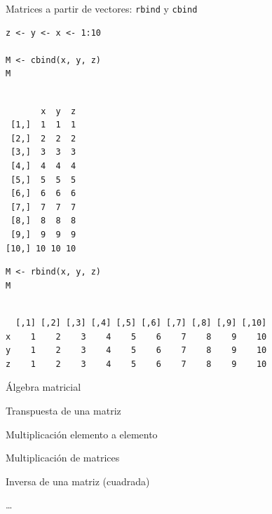\documentclass[aspectratio=169, usenames,svgnames,dvipsnames]{beamer}
\begin{document}
\begin{frame}[label={sec:org4ed9598},fragile]{Matrices a partir de vectores: \texttt{rbind} y \texttt{cbind}}
 \lstset{language=r,label= ,caption= ,captionpos=b,numbers=none}
\begin{lstlisting}
z <- y <- x <- 1:10

M <- cbind(x, y, z)
M
\end{lstlisting}

\begin{verbatim}

       x  y  z
 [1,]  1  1  1
 [2,]  2  2  2
 [3,]  3  3  3
 [4,]  4  4  4
 [5,]  5  5  5
 [6,]  6  6  6
 [7,]  7  7  7
 [8,]  8  8  8
 [9,]  9  9  9
[10,] 10 10 10
\end{verbatim}

\lstset{language=r,label= ,caption= ,captionpos=b,numbers=none}
\begin{lstlisting}
M <- rbind(x, y, z)
M
\end{lstlisting}

\begin{verbatim}

  [,1] [,2] [,3] [,4] [,5] [,6] [,7] [,8] [,9] [,10]
x    1    2    3    4    5    6    7    8    9    10
y    1    2    3    4    5    6    7    8    9    10
z    1    2    3    4    5    6    7    8    9    10
\end{verbatim}
\end{frame}

\begin{frame}[label={sec:org286c6ae},fragile]{Álgebra matricial}
 \begin{description}
\item[{\texttt{t()}}] Transpuesta de una matriz
\item[{\texttt{*}}] Multiplicación elemento a elemento
\item[{\texttt{\%*\%}}] Multiplicación de matrices
\item[{\texttt{solve(A)}}] Inversa de una matriz (cuadrada)
\item \ldots{}
\end{description}
\end{frame}
\end{document}
